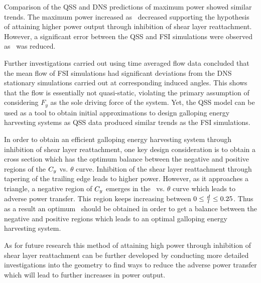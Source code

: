 Comparison of the QSS and DNS predictions of maximum power showed similar trends. The maximum power increased as \ratio\  decreased supporting the hypothesis of attaining higher power output through inhibition of shear layer reattachment. However, a significant error between the QSS and FSI simulations were observed as \ratio\ was reduced. 
 
Further investigations carried out using time averaged flow data concluded that the mean flow of FSI simulations had significant deviations from the DNS stationary simulations carried out at corresponding induced angles. This shows that the flow is essentially not quasi-static, violating the primary assumption of considering $F_y$ as the sole driving force of the system. Yet, the QSS model can be used as a tool to obtain initial approximations to design galloping energy harvesting systems as QSS data produced similar trends as the FSI simulations.
 
In order to obtain an efficient galloping energy harvesting system through inhibition of shear layer reattachment, one key design consideration is to obtain a cross section which has the optimum balance between the negative and positive regions of the $C_{y}$ vs. $\theta$ curve. Inhibition of  the shear layer reattachment through tapering of the trailing edge leads to higher power. However, as it approaches a triangle, a negative region of $C_{y}$ emerges in the \cy\ vs. $\theta$ curve which leads to adverse power transfer. This region keeps increasing between $0\leq\frac{d}{l}\leq0.25$. Thus as a result an optimum \ratio\ should be obtained in order to get a balance between the negative and positive regions which leads to an optimal galloping energy harvesting system. 
 
 As for future research this method of attaining high power through inhibition of shear layer reattachment can be further developed by conducting more detailed investigations into the geometry to find ways to reduce the adverse power transfer which will lead to further increases in power output.
